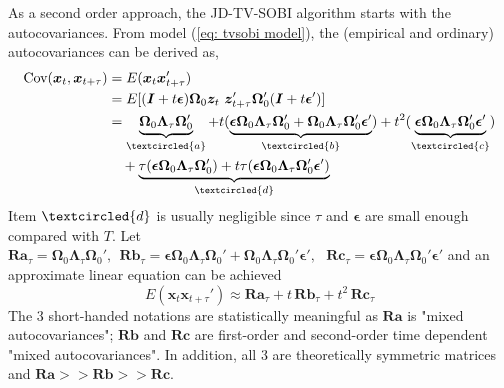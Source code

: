 \documentclass[utf8,english]{gradu3}
\begin{document}
As a second order approach, the JD-TV-SOBI algorithm starts with the autocovariances. From model (\ref{eq: tvsobi model}), the (empirical and ordinary) autocovariances can be derived as,
\begin{equation*}
    \begin{aligned}
\text{Cov}( \boldsymbol x_t , \boldsymbol x_{t+\tau}) &= E(\boldsymbol x_t \boldsymbol x_{t+\tau}')
\\ & = E[( \boldsymbol I + t \boldsymbol{\epsilon})\boldsymbol \Omega_0 \boldsymbol  z_t\ \boldsymbol  z_{t+\tau} ' \boldsymbol \Omega_0 '( \boldsymbol I + t \boldsymbol{\epsilon}')]
\\ &= \underbrace{\boldsymbol\Omega_0 \boldsymbol\Lambda_\tau \boldsymbol \Omega_0'}_{\textcircled{a}}
 + t (\underbrace{ \boldsymbol{\epsilon } \boldsymbol\Omega_0 \boldsymbol\Lambda_\tau \boldsymbol \Omega_0' +  \boldsymbol\Omega_0 \boldsymbol\Lambda_\tau \boldsymbol \Omega_0' \boldsymbol{\epsilon}'} _{\textcircled{b}} )
 + t^2 (\underbrace{\boldsymbol{\epsilon} \boldsymbol\Omega_0 \boldsymbol\Lambda_\tau \boldsymbol \Omega_0' \boldsymbol{\epsilon}'}_{\textcircled{c}})
  \\ &\ \ \  + \underbrace {\tau (\boldsymbol{\epsilon} \boldsymbol\Omega_0 \boldsymbol\Lambda_\tau \boldsymbol \Omega_0')
 + t \tau (\boldsymbol{\epsilon} \boldsymbol\Omega_0 \boldsymbol\Lambda_\tau \boldsymbol \Omega_0' \boldsymbol{\epsilon}')}_{\textcircled{d}}
\end{aligned}
\end{equation*}
Item $\textcircled{d}$ is usually negligible since $\tau$ and $\boldsymbol{\epsilon}$ are small enough compared with $T$. Let $\boldsymbol{Ra}_\tau = \boldsymbol\Omega_0 \boldsymbol\Lambda_\tau \boldsymbol \Omega_0',\ \ \boldsymbol{Rb}_\tau = \boldsymbol{\epsilon} \boldsymbol\Omega_0 \boldsymbol\Lambda_\tau \boldsymbol \Omega_0' +  \boldsymbol\Omega_0 \boldsymbol\Lambda_\tau \boldsymbol \Omega_0' \boldsymbol{\epsilon}',\ \ \ \boldsymbol{Rc}_\tau = \boldsymbol{\epsilon} \boldsymbol\Omega_0 \boldsymbol\Lambda_\tau \boldsymbol \Omega_0' \boldsymbol{\epsilon}'$ and an approximate linear equation can be achieved
\begin{equation}
\label{eq: covariance structure}
    E(\boldsymbol x_t \boldsymbol x_{t+\tau}') \approx  \boldsymbol{Ra}_\tau + t\, \boldsymbol{Rb}_\tau + t^2\, \boldsymbol{Rc}_\tau
\end{equation}
The 3 short-handed notations are statistically meaningful as $\boldsymbol{Ra}$ is "mixed autocovariances"; $\boldsymbol{Rb}$ and $\boldsymbol{Rc}$ are first-order and second-order time dependent "mixed autocovariances". In addition, all 3 are theoretically symmetric matrices and $\boldsymbol{Ra} >> \boldsymbol{Rb} >> \boldsymbol{Rc}$.
\end{document}
